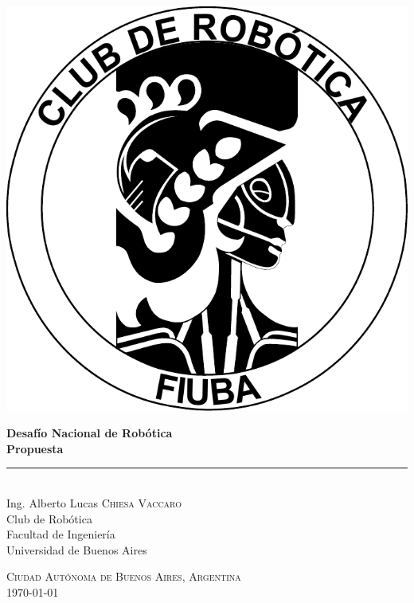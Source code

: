 \begin{titlepage}
\begin{flushright}
\large \sffamily

\vspace*{-1.7cm}
\includegraphics[width=.5\textwidth]{img/logo_atras.pdf}\\[2cm]

\begin{huge}
\bfseries
\textbf{Desafío Nacional de Robótica\\ Propuesta}\par
\end{huge}
\rule{\linewidth}{1.5mm}\\[0.1cm]

Ing. Alberto Lucas \textsc{Chiesa Vaccaro}\\

\vspace{10mm}
Club de Robótica \\
Facultad de Ingeniería \\
Universidad de Buenos Aires

\begin{table}[b]
\flushbottom
\centering \sffamily %
\textsc{Ciudad Autónoma de Buenos Aires, Argentina}\\[1mm]
\today
\end{table}

\end{flushright}
\end{titlepage}

\thispagestyle{empty}
\cleardoublepage